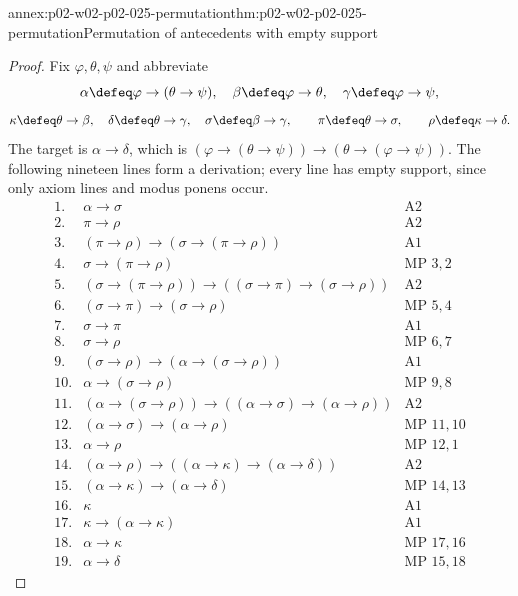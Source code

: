 \begin{annexitem}{annex:p02-w02-p02-025-permutation}{thm:p02-w02-p02-025-permutation}{Permutation of antecedents with empty support}
\begin{proof}
Fix \(\varphi,\theta,\psi\) and abbreviate
\[
 \alpha\defeq\varphi\to(\theta\to\psi),\quad
 \beta\defeq\varphi\to\theta,\quad
 \gamma\defeq\varphi\to\psi,
\]
\[
 \kappa\defeq\theta\to\beta,\quad
 \delta\defeq\theta\to\gamma,\quad
 \sigma\defeq\beta\to\gamma,\qquad
 \pi\defeq\theta\to\sigma,\qquad
 \rho\defeq\kappa\to\delta .
\]
The target is \(\alpha\to\delta\), which is
\((\varphi\to(\theta\to\psi))\to(\theta\to(\varphi\to\psi))\).  The
following nineteen lines form a derivation; every line has empty support,
since only axiom lines and modus ponens occur.
\[
\begin{array}{lll}
 1. & \alpha\to\sigma & \text{A2}\\
 2. & \pi\to\rho & \text{A2}\\
 3. & (\pi\to\rho)\to(\sigma\to(\pi\to\rho)) & \text{A1}\\
 4. & \sigma\to(\pi\to\rho) & \text{MP }3,2\\
 5. & (\sigma\to(\pi\to\rho))\to((\sigma\to\pi)\to(\sigma\to\rho)) & \text{A2}\\
 6. & (\sigma\to\pi)\to(\sigma\to\rho) & \text{MP }5,4\\
 7. & \sigma\to\pi & \text{A1}\\
 8. & \sigma\to\rho & \text{MP }6,7\\
 9. & (\sigma\to\rho)\to(\alpha\to(\sigma\to\rho)) & \text{A1}\\
 10. & \alpha\to(\sigma\to\rho) & \text{MP }9,8\\
 11. & (\alpha\to(\sigma\to\rho))\to((\alpha\to\sigma)\to(\alpha\to\rho)) & \text{A2}\\
 12. & (\alpha\to\sigma)\to(\alpha\to\rho) & \text{MP }11,10\\
 13. & \alpha\to\rho & \text{MP }12,1\\
 14. & (\alpha\to\rho)\to((\alpha\to\kappa)\to(\alpha\to\delta)) & \text{A2}\\
 15. & (\alpha\to\kappa)\to(\alpha\to\delta) & \text{MP }14,13\\
 16. & \kappa & \text{A1}\\
 17. & \kappa\to(\alpha\to\kappa) & \text{A1}\\
 18. & \alpha\to\kappa & \text{MP }17,16\\
 19. & \alpha\to\delta & \text{MP }15,18
\end{array}
\]
\end{proof}
\end{annexitem}
